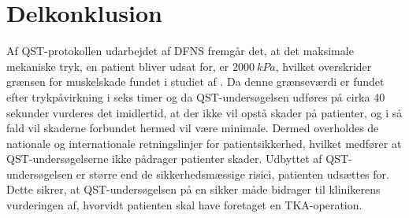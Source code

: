 \section{Delkonklusion}
Af QST-protokollen udarbejdet af DFNS fremgår det, at det maksimale mekaniske tryk, en patient bliver udsat for, er $2000~kPa$, hvilket overskrider grænsen for muskelskade fundet i studiet af . Da denne grænseværdi er fundet efter trykpåvirkning i seks timer og da QST-undersøgelsen udføres på cirka 40 sekunder vurderes det imidlertid, at der ikke vil opstå skader på patienter, og i så fald vil skaderne forbundet hermed vil være minimale. Dermed overholdes de nationale og internationale retningslinjer for patientsikkerhed, hvilket medfører at QST-undersøgelserne ikke pådrager patienter skader. Udbyttet af QST-undersøgelsen er større end de sikkerhedsmæssige risici, patienten udsættes for. Dette sikrer, at QST-undersøgelsen på en sikker måde bidrager til klinikerens vurderingen af, hvorvidt patienten skal have foretaget en TKA-operation.

